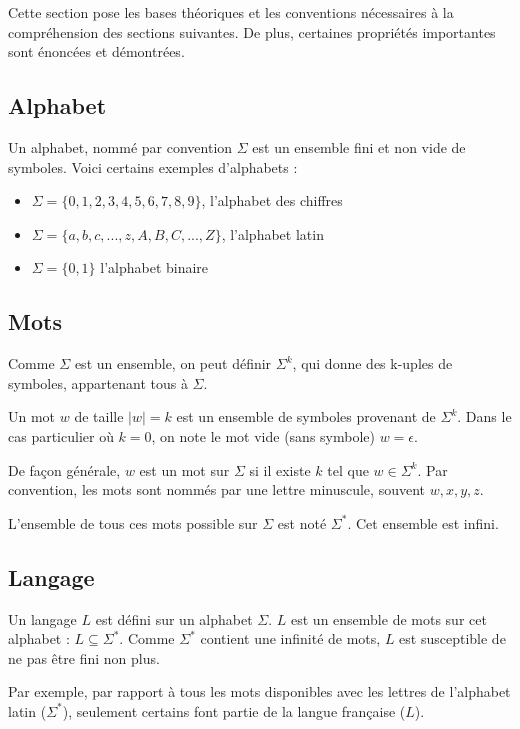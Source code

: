 Cette section pose les bases théoriques et les conventions nécessaires à la compréhension des sections suivantes. De plus, certaines propriétés importantes sont énoncées et démontrées.

	\subsection{Alphabet}
	
	Un alphabet, nommé par convention $\Sigma$ est un ensemble fini et non vide de symboles.
	Voici certains exemples d'alphabets :
	\begin{itemize}
		\item $\Sigma = \{0,1,2,3,4,5,6,7,8,9\}$, l'alphabet des chiffres
		\item $\Sigma = \{a,b,c,...,z,A,B,C,...,Z\}$, l'alphabet latin
		\item $\Sigma = \{0,1\}$ l'alphabet binaire
	\end{itemize}

	\subsection{Mots}
	
	Comme $\Sigma$ est un ensemble, on peut définir $\Sigma^k$, qui donne des k-uples de symboles, appartenant tous à $\Sigma$.
	
	Un mot $w$ de taille $|w|=k$ est un ensemble de symboles provenant de $\Sigma^k$. Dans le cas particulier où $k=0$, on note le mot vide (sans symbole) $w=\epsilon$.
	
	De façon générale, $w$ est un mot sur $\Sigma$ si il existe $k$ tel que $w \in \Sigma^k$. Par convention, les mots sont nommés par une lettre minuscule, souvent $w,x,y,z$. 
	
	L'ensemble de tous ces mots possible sur $\Sigma$ est noté $\Sigma^*$. Cet ensemble est infini.
	

	
	\subsection{Langage}
	
	Un langage $L$ est défini sur un alphabet $\Sigma$. $L$ est un ensemble de mots sur cet alphabet : $L \subseteq \Sigma^*$. Comme $\Sigma^*$ contient une infinité de mots, $L$ est susceptible de ne pas être fini non plus.
	
	Par exemple, par rapport à tous les mots disponibles avec les lettres de l'alphabet latin ($\Sigma^*$), seulement certains font partie de la langue française ($L$).
	
